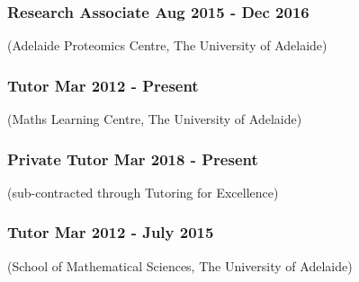 \documentclass[a4paper,12pt]{report}
\begin{document}
\subsubsection*{Research Associate  \hfill Aug 2015 - Dec 2016} \vspace{-6pt}
(Adelaide Proteomics Centre, The University of Adelaide) \\[4pt]
\vspace{-0.7cm}

\subsubsection*{Tutor \hfill Mar 2012 - Present} \vspace{-6pt}
(Maths Learning Centre, The University of Adelaide) \\[4pt]
\vspace{-0.7cm}

\subsubsection*{Private Tutor \hfill Mar 2018 - Present} \vspace{-6pt}
(sub-contracted through Tutoring for Excellence) \\[4pt]
\vspace{-0.7cm}

\subsubsection*{Tutor \hfill Mar 2012 - July 2015} \vspace{-6pt}
(School of Mathematical Sciences, The University of Adelaide) \\[4pt]
\vspace{-0.7cm}


%
%
%
%
\end{document}
